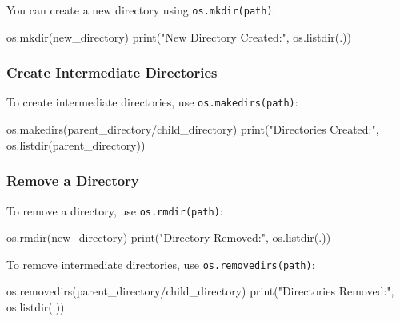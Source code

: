 \documentclass[
  letterpaper,
  DIV=11,
  numbers=noendperiod]{scrreprt}
\newenvironment{Shaded}{\begin{snugshade}}{\end{snugshade}}
\newcommand{\BuiltInTok}[1]{\textcolor[rgb]{0.00,0.23,0.31}{#1}}
\newcommand{\NormalTok}[1]{\textcolor[rgb]{0.00,0.23,0.31}{#1}}
\newcommand{\StringTok}[1]{\textcolor[rgb]{0.13,0.47,0.30}{#1}}
\begin{document}
You can create a new directory using \texttt{os.mkdir(path)}:

\begin{Shaded}
\begin{Highlighting}[]
\NormalTok{os.mkdir(}\StringTok{\textquotesingle{}new\_directory\textquotesingle{}}\NormalTok{)}
\BuiltInTok{print}\NormalTok{(}\StringTok{"New Directory Created:"}\NormalTok{, os.listdir(}\StringTok{\textquotesingle{}.\textquotesingle{}}\NormalTok{))}
\end{Highlighting}
\end{Shaded}

\subsubsection{Create Intermediate
Directories}\label{create-intermediate-directories}

To create intermediate directories, use \texttt{os.makedirs(path)}:

\begin{Shaded}
\begin{Highlighting}[]
\NormalTok{os.makedirs(}\StringTok{\textquotesingle{}parent\_directory/child\_directory\textquotesingle{}}\NormalTok{)}
\BuiltInTok{print}\NormalTok{(}\StringTok{"Directories Created:"}\NormalTok{, os.listdir(}\StringTok{\textquotesingle{}parent\_directory\textquotesingle{}}\NormalTok{))}
\end{Highlighting}
\end{Shaded}

\subsubsection{Remove a Directory}\label{remove-a-directory}

To remove a directory, use \texttt{os.rmdir(path)}:

\begin{Shaded}
\begin{Highlighting}[]
\NormalTok{os.rmdir(}\StringTok{\textquotesingle{}new\_directory\textquotesingle{}}\NormalTok{)}
\BuiltInTok{print}\NormalTok{(}\StringTok{"Directory Removed:"}\NormalTok{, os.listdir(}\StringTok{\textquotesingle{}.\textquotesingle{}}\NormalTok{))}
\end{Highlighting}
\end{Shaded}

To remove intermediate directories, use \texttt{os.removedirs(path)}:

\begin{Shaded}
\begin{Highlighting}[]
\NormalTok{os.removedirs(}\StringTok{\textquotesingle{}parent\_directory/child\_directory\textquotesingle{}}\NormalTok{)}
\BuiltInTok{print}\NormalTok{(}\StringTok{"Directories Removed:"}\NormalTok{, os.listdir(}\StringTok{\textquotesingle{}.\textquotesingle{}}\NormalTok{))}
\end{Highlighting}
\end{Shaded}
\end{document}
